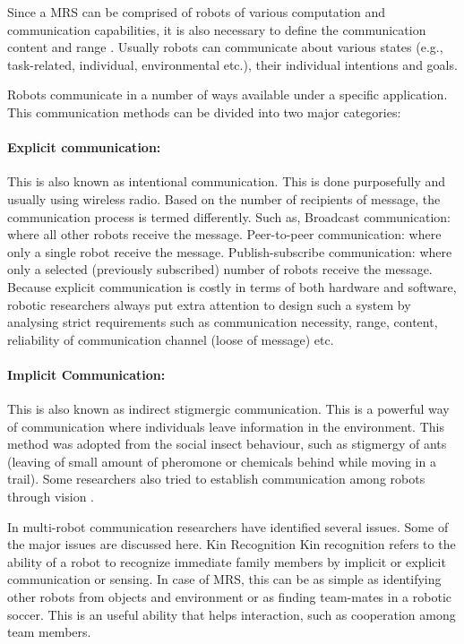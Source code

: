 Since a MRS  can be comprised of robots of various computation and communication capabilities, it is also necessary to define the communication content and range \cite{Arkin1998,Mataric2007}. Usually robots can communicate about various states (e.g., task-related, individual, environmental etc.), their individual intentions and goals. 
 
Robots communicate in a number of ways available under a specific application. This communication methods can be divided into two major categories:

\paragraph{Explicit communication:}
This is also known as intentional communication. This is done purposefully and usually using wireless radio. Based on the number of recipients of message, the communication process is termed differently. Such as,
Broadcast communication: where all other robots receive the message.
Peer-to-peer communication: where only a single robot receive the message.
Publish-subscribe communication: where only a selected (previously subscribed) number of robots receive the message.
Because explicit communication is costly in terms of both hardware and software, robotic researchers always put extra attention to design such a system by analysing strict requirements such as communication necessity, range, content, reliability of communication channel (loose of message) etc.

\paragraph{Implicit Communication:} 
This is also known as indirect stigmergic communication. This is a powerful way of communication where individuals leave information in the environment. This method was adopted from the social insect behaviour, such as stigmergy of ants (leaving of small amount of pheromone or chemicals behind while moving in a trail). Some researchers also tried to establish communication among robots through vision \cite{Kuniyoshi1994}.

In multi-robot communication researchers have identified several issues. Some of the major issues are discussed here.
Kin Recognition
Kin recognition refers to the ability of a robot to recognize immediate family members by implicit or explicit communication or sensing. In case of MRS, this can be as simple as identifying other robots from objects and environment or as finding team-mates in a robotic soccer. This is an useful ability that helps interaction, such as cooperation among team members. 

